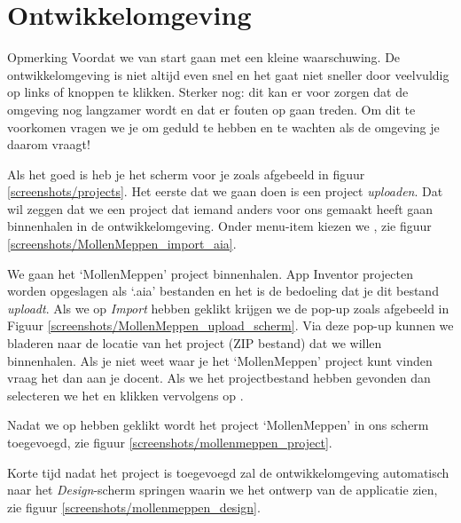 \chapter{Ontwikkelomgeving}
\label{chap:ontwikkelomgeving}

\begin{derivation}{Opmerking}
Voordat we van start gaan met \ai een kleine waarschuwing. De ontwikkelomgeving is niet altijd even snel en het gaat niet sneller door veelvuldig op links of knoppen te klikken. Sterker nog: dit kan er voor zorgen dat de omgeving nog langzamer wordt en dat er fouten op gaan treden. Om dit te voorkomen vragen we je om geduld te hebben en te wachten als de omgeving je daarom vraagt!
\end{derivation}

Als het goed is heb je het scherm voor je zoals afgebeeld in figuur \ref{screenshots/projects}. Het eerste dat we gaan doen is een project \emph{uploaden}. Dat wil zeggen dat we een project dat iemand anders voor ons gemaakt heeft gaan binnenhalen in de  ontwikkelomgeving. Onder menu-item  kiezen we , zie figuur \ref{screenshots/MollenMeppen_import_aia}.

We gaan het `MollenMeppen' project binnenhalen. App Inventor projecten worden opgeslagen als `.aia' bestanden en het is de bedoeling dat je dit bestand \emph{uploadt}. Als we op \emph{Import} hebben geklikt krijgen we de pop-up zoals afgebeeld in 
Figuur \ref{screenshots/MollenMeppen_upload_scherm}. 
Via deze pop-up kunnen we bladeren naar de locatie van het project (ZIP bestand) dat we willen binnenhalen. Als je niet weet waar je het `MollenMeppen' project kunt vinden vraag het dan aan je docent.
Als we het projectbestand hebben gevonden dan selecteren we het en klikken vervolgens op .
 
Nadat  we op  hebben geklikt wordt het project `MollenMeppen' in ons scherm toegevoegd, zie figuur \ref{screenshots/mollenmeppen_project}.


Korte tijd nadat het project is toegevoegd zal de ontwikkelomgeving automatisch naar het \emph{Design}-scherm springen waarin we het ontwerp van de applicatie zien, zie figuur \ref{screenshots/mollenmeppen_design}. 


